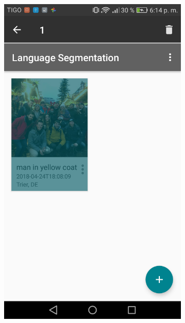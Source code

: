 \begin{figure}[!htbp]
\begin{multicols}{3}
    \begin{subfigure}[b]{\columnwidth}
            \centering
            \includegraphics[width=\textwidth]{./figures/dmn_app/views/16.png}
    \label{subfig:selection_overlay}
    \end{subfigure}
    

\end{multicols}
\end{figure}
